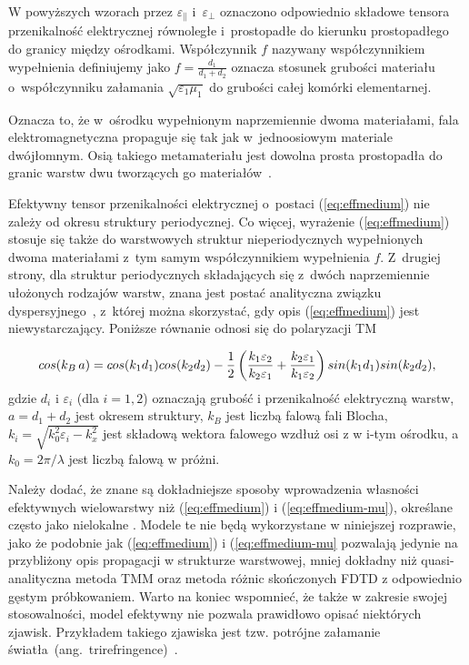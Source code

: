W powyższych wzorach przez $\varepsilon_{\parallel}$ i~$\varepsilon_{\perp}$ oznaczono odpowiednio składowe tensora przenikalność elektrycznej równoległe i~prostopadłe do kierunku prostopadłego do granicy między ośrodkami. Współczynnik $f$ nazywany współczynnikiem wypełnienia definiujemy jako $f=\frac{d_1}{d_1+d_2}$ oznacza stosunek grubości materiału o~współczynniku załamania $\sqrt{\varepsilon_1 \mu_1}$ do grubości całej komórki elementarnej.

Oznacza to, że w~ośrodku wypełnionym naprzemiennie dwoma materiałami, fala elektromagnetyczna propaguje się tak jak w~jednoosiowym materiale dwójłomnym. Osią takiego metamateriału jest dowolna prosta prostopadła do granic warstw dwu tworzących go materiałów~\cite{sihvola1999electromagnetic}.

Efektywny tensor przenikalności elektrycznej o~postaci (\ref{eq:effmedium}) nie zależy od okresu struktury periodycznej. Co więcej, wyrażenie (\ref{eq:effmedium}) stosuje się  także do warstwowych struktur nieperiodycznych wypełnionych dwoma materiałami z~tym samym współczynnikiem wypełnienia $f$. Z~drugiej strony, dla struktur periodycznych składających się z~dwóch naprzemiennie ułożonych rodzajów warstw, znana jest postać analityczna związku dyspersyjnego~\cite{pastuszczak2011optimized}, z~której można skorzystać, gdy opis (\ref{eq:effmedium}) jest niewystarczający. Poniższe równanie odnosi się do polaryzacji TM

\begin{equation}
cos(k_{B} \,a) = cos(k_{1} d_1) cos(k_{2} d_2) \\
- \frac{1}{2} \left(\frac{k_{1} \varepsilon_2}{k_{2} \varepsilon_1} + \frac{k_{2} \varepsilon_1}{k_{1} \varepsilon_2}\right)
sin(k_{1} d_1) sin(k_{2} d_2),
\label{eq_dispersion}
\end{equation}
gdzie $d_i$ i $\varepsilon_i$ (dla $i=1,2$) oznaczają grubość i przenikalność elektryczną warstw, $a=d_1+d_2$ jest okresem struktury, $k_B$ jest liczbą falową fali Blocha, $k_i = \sqrt{k_0^2 \varepsilon_i-k_{x}^2}$ jest składową wektora falowego wzdłuż osi z w i-tym ośrodku, a $k_0=2\pi/\lambda$ jest liczbą falową w próżni. 

Należy dodać, że znane są dokładniejsze sposoby wprowadzenia własności efektywnych wielowarstwy niż (\ref{eq:effmedium}) i (\ref{eq:effmedium-mu}), określane często jako nielokalne \cite{elser2007nonlocal,chebykin2011nonlocal}. Modele te nie będą wykorzystane w niniejszej rozprawie, jako że podobnie jak (\ref{eq:effmedium}) i (\ref{eq:effmedium-mu} pozwalają jedynie na przybliżony opis propagacji w strukturze warstwowej, mniej dokładny niż quasi-analityczna metoda TMM oraz metoda różnic skończonych FDTD z odpowiednio gęstym próbkowaniem. Warto na koniec wspomnieć, że także w zakresie swojej stosowalności, model efektywny nie pozwala prawidłowo opisać niektórych zjawisk. Przykładem takiego zjawiska jest tzw. potrójne załamanie światła~(ang.~trirefringence)~\cite{netti2001optical,diaz2016some}.
